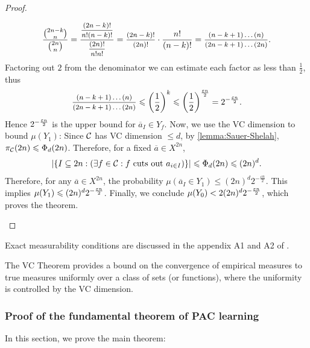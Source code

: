 \begin{proof}
\begin{outline}
        \begin{align*}
            \frac{\binom{2n-k}{n}}{\binom{2n}{n}}= 
            \frac{\mfrac{(2n-k)!}{n! (n-k)!}}{\mfrac{(2n)!}{n!n!}} =
            \mfrac{(2n-k)!}{(2n)!}\cdot\frac{n!}{(n-k)!} =
            \mfrac{(n-k+1)\ldots(n)}{(2n-k+1)\ldots(2n)}.
        \end{align*}
        Factoring out $2$ from the denominator we can estimate each factor as less than $\frac{1}{2}$, thus 
        $$
        \mfrac{(n-k+1)\ldots(n)}{(2n-k+1)\ldots(2n)} 
        \leq \left(\frac{1}{2}\right)^k
        \leq \left(\frac{1}{2}\right)^{\frac{\eps n}{2}}
        = 2^{-\frac{\eps n}{2}}.
        $$
        Hence $2^{-\frac{\varepsilon n}{2}}$ is the upper bound for $\overline{a}_I\in Y_f$. 
\0 Now, we use the VC dimension to bound $\mu(Y_1)$:
    \1 Since $\mathcal{C}$ has VC dimension $\leq d$, by \cref{lemma:Sauer-Shelah}, $\pi_{\mathcal{C}}(2n)\leqslant \Phi_d(2n)$. Therefore, for a fixed $\overline{a}\in X^{2n}$,
    $$
    |\{
    I\subseteq 2n : (\exists f \in \mathcal{C} : f \text{ cuts out }a_{i\in I})
    \}| 
    \leqslant \Phi_d(2n) \leqslant (2n)^d.
    $$
    Therefore, for any $\overline{a}\in X^{2n}$, the probability $\mu(\overline{a}_I \in Y_1) \leq (2n)^d 2^{-\frac{\varepsilon n}{2}}$. This implies $\mu(Y_1)\leqslant (2n)^d 2^{-\frac{\varepsilon n}{2}}$.
\0 Finally, we conclude $\mu(Y_0)<2(2n)^d 2^{-\frac{\varepsilon n}{2}}$, which proves the theorem.
\end{outline}
\end{proof}

\begin{remark}
\begin{outline}
    \0 Exact measurability conditions are discussed in the appendix A1 and A2 of \cite{blumer1989learnability}.
\end{outline}
\end{remark}

The VC Theorem provides a bound on the convergence of empirical measures to true measures uniformly over a class of sets (or functions), where the uniformity is controlled by the VC dimension.

\subsubsection{Proof of the fundamental theorem of PAC learning}
\label{subsection:3}

In this section, we prove the main theorem:


